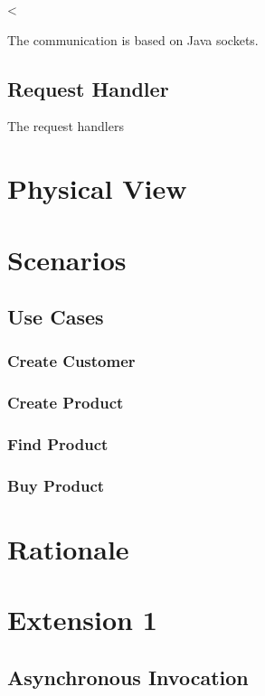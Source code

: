 <\documentclass[a4paper]{article}
\begin{document}
The communication is based on Java sockets.

\subsection{Request Handler}

The request handlers 

\section{Physical View}

\section{Scenarios}

\subsection{Use Cases}

\subsubsection{Create Customer}

\subsubsection{Create Product}

\subsubsection{Find Product}

\subsubsection{Buy Product}

\section{Rationale}

\section{Extension 1}

\subsection{Asynchronous Invocation}
\end{document}
